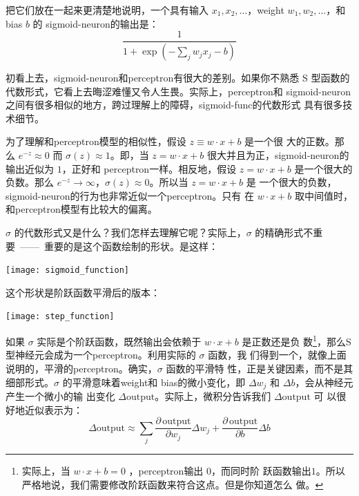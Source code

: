 把它们放在一起来更清楚地说明，一个具有输入 $x_1,x_2,\ldots$，\gls*{weight}
$w_1,w_2,\ldots$，和\gls*{bias} $b$ 的 \gls*{sigmoid-neuron}的输出是：
\begin{equation}
  \frac{1}{1+\exp(-\sum_j w_j x_j-b)}
  \label{eq:4}\tag{4}
\end{equation}

初看上去，\gls*{sigmoid-neuron}和\gls*{perceptron}有很大的差别。如果你不熟悉 S
型函数的代数形式，它看上去晦涩难懂又令人生畏。实际上，\gls*{perceptron}和
\gls*{sigmoid-neuron}之间有很多相似的地方，跨过理解上的障碍，\gls*{sigmoid-func}的代数形式
具有很多技术细节。

为了理解和\gls*{perceptron}模型的相似性，假设 $z \equiv w \cdot x + b$ 是一个很
大的正数。那么 $e^{-z} \approx 0$ 而 $\sigma(z) \approx 1$。即，当 $z = w \cdot
x+b$ 很大并且为正，\gls*{sigmoid-neuron}的输出近似为 $1$，正好和%
\gls*{perceptron}一样。相反地，假设 $z = w \cdot x+b$ 是一个很大的负数。那么
$e^{-z} \rightarrow \infty$，$\sigma(z) \approx 0$。所以当 $z = w \cdot x +b$ 是
一个很大的负数，\gls*{sigmoid-neuron}的行为也非常近似一个\gls*{perceptron}。只有
在 $w \cdot x+b$ 取中间值时，和\gls*{perceptron}模型有比较大的偏离。

$\sigma$ 的代数形式又是什么？我们怎样去理解它呢？实际上，$\sigma$ 的精确形式不重
要~——~重要的是这个函数绘制的形状。是这样：
\begin{center}
  \texttt{[image: sigmoid\_function]}
  \label{fig:SigmoidFunction}
\end{center}

这个形状是阶跃函数平滑后的版本：
\begin{center}
  \texttt{[image: step\_function]}
  \label{fig:StepFunction}
\end{center}

如果 $\sigma$ 实际是个阶跃函数，既然输出会依赖于 $w\cdot x+b$ 是正数还是负
数\footnote{实际上，当 $w \cdot x +b = 0$ ，\gls*{perceptron}输出 $0$，而同时阶
  跃函数输出$1$。所以严格地说，我们需要修改阶跃函数来符合这点。但是你知道怎么
  做。}，那么S型神经元会成为一个\gls*{perceptron}。利用实际的 $\sigma$ 函数，我
们得到一个，就像上面说明的，平滑的\gls*{perceptron}。确实，$\sigma$ 函数的平滑特
性，正是关键因素，而不是其细部形式。$\sigma$ 的平滑意味着\gls*{weight}和%
\gls*{bias}的微小变化，即 $\Delta w_j$ 和 $\Delta b$，会从神经元产生一个微小的输
出变化 $\Delta \mbox{output}$。实际上，微积分告诉我们 $\Delta \mbox{output}$ 可
以很好地近似表示为：
\begin{equation}
  \Delta \mbox{output} \approx \sum_j \frac{\partial \, \mbox{output}}{\partial w_j}
  \Delta w_j + \frac{\partial \, \mbox{output}}{\partial b} \Delta b
  \label{eq:5}\tag{5}
\end{equation}

